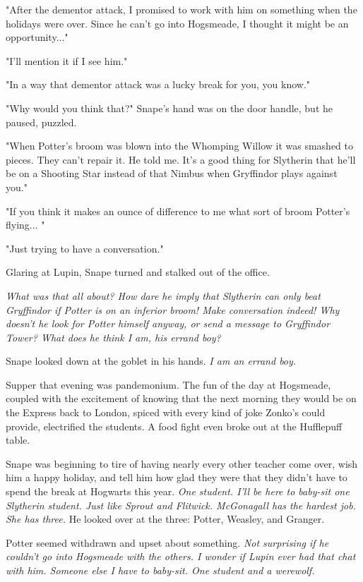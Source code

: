\documentclass[a4paper,11pt]{article}
\begin{document}
"After the dementor attack, I promised to work with him on something when the holidays were over. Since he can't go into Hogsmeade, I thought it might be an opportunity..."

"I'll mention it if I see him."

"In a way that dementor attack was a lucky break for you, you know."

"Why would you think that?" Snape's hand was on the door handle, but he paused, puzzled.

"When Potter's broom was blown into the Whomping Willow it was smashed to pieces. They can't repair it. He told me. It's a good thing for Slytherin that he'll be on a Shooting Star instead of that Nimbus when Gryffindor plays against you."

"If you think it makes an ounce of difference to me what sort of broom Potter's flying... "

"Just trying to have a conversation."

Glaring at Lupin, Snape turned and stalked out of the office.

\emph{What was that all about? How dare he imply that Slytherin can only beat Gryffindor if Potter is on an inferior broom! Make conversation indeed! Why doesn't he look for Potter himself anyway, or send a message to Gryffindor Tower? What does he think I am, his errand boy?}

Snape looked down at the goblet in his hands. \emph{I am an errand boy.}

Supper that evening was pandemonium. The fun of the day at Hogsmeade, coupled with the excitement of knowing that the next morning they would be on the Express back to London, spiced with every kind of joke Zonko's could provide, electrified the students. A food fight even broke out at the Hufflepuff table.

Snape was beginning to tire of having nearly every other teacher come over, wish him a happy holiday, and tell him how glad they were that they didn't have to spend the break at Hogwarts this year. \emph{One student. I'll be here to baby-sit one Slytherin student. Just like Sprout and Flitwick. McGonagall has the hardest job. She has three.} He looked over at the three: Potter, Weasley, and Granger.

Potter seemed withdrawn and upset about something. \emph{Not surprising if he couldn't go into Hogsmeade with the others. I wonder if Lupin ever had that chat with him. Someone else I have to baby-sit. One student and a werewolf.}
\end{document}
